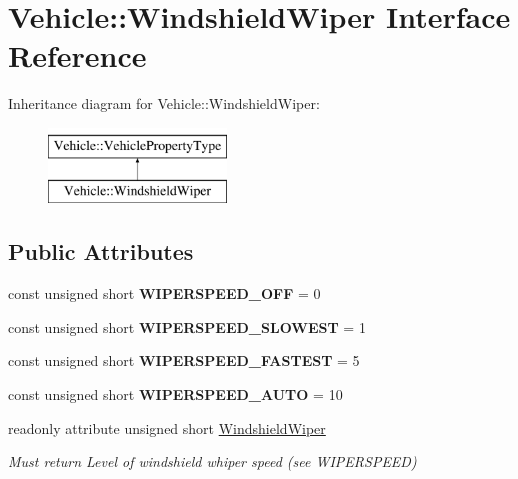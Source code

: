 \hypertarget{interfaceVehicle_1_1WindshieldWiper}{\section{Vehicle\-:\-:Windshield\-Wiper Interface Reference}
\label{interfaceVehicle_1_1WindshieldWiper}
}
Inheritance diagram for Vehicle\-:\-:Windshield\-Wiper\-:\begin{figure}[H]
\begin{center}
\leavevmode
\includegraphics[height=2.000000cm]{interfaceVehicle_1_1WindshieldWiper}
\end{center}
\end{figure}
\subsection*{Public Attributes}
\begin{DoxyCompactItemize}
\item 
\hypertarget{interfaceVehicle_1_1WindshieldWiper_a7cd57354ba971864fc6363e469af9115}{const unsigned short {\bfseries W\-I\-P\-E\-R\-S\-P\-E\-E\-D\-\_\-\-O\-F\-F} = 0}\label{interfaceVehicle_1_1WindshieldWiper_a7cd57354ba971864fc6363e469af9115}

\item 
\hypertarget{interfaceVehicle_1_1WindshieldWiper_a2226e5066d401d03e45e83bf6492cad8}{const unsigned short {\bfseries W\-I\-P\-E\-R\-S\-P\-E\-E\-D\-\_\-\-S\-L\-O\-W\-E\-S\-T} = 1}\label{interfaceVehicle_1_1WindshieldWiper_a2226e5066d401d03e45e83bf6492cad8}

\item 
\hypertarget{interfaceVehicle_1_1WindshieldWiper_a0413a51343cde6a454fc6314f0f5fc7d}{const unsigned short {\bfseries W\-I\-P\-E\-R\-S\-P\-E\-E\-D\-\_\-\-F\-A\-S\-T\-E\-S\-T} = 5}\label{interfaceVehicle_1_1WindshieldWiper_a0413a51343cde6a454fc6314f0f5fc7d}

\item 
\hypertarget{interfaceVehicle_1_1WindshieldWiper_a2c670f71be15e2918115abaa23789c21}{const unsigned short {\bfseries W\-I\-P\-E\-R\-S\-P\-E\-E\-D\-\_\-\-A\-U\-T\-O} = 10}\label{interfaceVehicle_1_1WindshieldWiper_a2c670f71be15e2918115abaa23789c21}

\item 
readonly attribute unsigned short \hyperlink{interfaceVehicle_1_1WindshieldWiper_a6c1c19e5f3b5c7a69e2fec50a8f280fc}{Windshield\-Wiper}
\begin{DoxyCompactList}\small\item\em Must return Level of windshield whiper speed (see W\-I\-P\-E\-R\-S\-P\-E\-E\-D) \end{DoxyCompactList}\end{DoxyCompactItemize}
